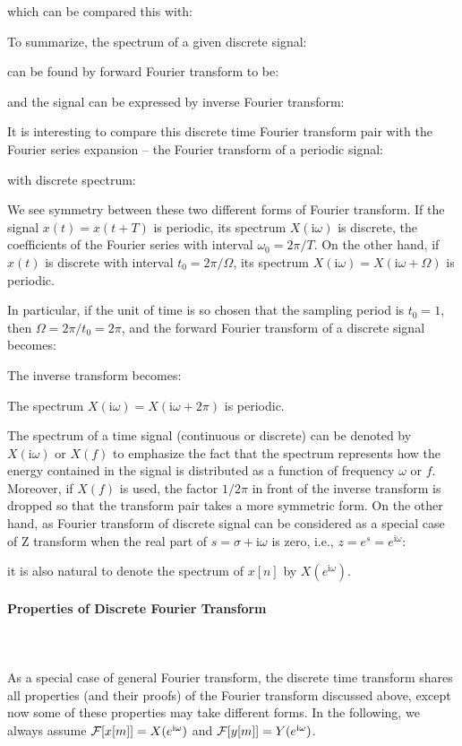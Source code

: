 	which can be compared this with:
	
	To summarize, the spectrum of a given discrete signal:
	
	can be found by forward Fourier transform to be:
	
	and the signal can be expressed by inverse Fourier transform:
	
	It is interesting to compare this discrete time Fourier transform pair with the Fourier series expansion -- the Fourier transform of a periodic signal: 
	
	
	with discrete spectrum:
	
	We see symmetry between these two different forms of Fourier transform. If the  signal $x(t)=x(t+T)$ is periodic, its spectrum $X(\mathrm{i}\omega)$ is discrete, the coefficients of the Fourier series with interval $\omega_0=2\pi/T$. On the other hand, if $x(t)$ is discrete with interval $t_0=2\pi/\Omega$, its spectrum $X(\mathrm{i}\omega)=X(\mathrm{i}\omega+\Omega)$ is periodic.
	
	In particular, if the unit of time is so chosen that the sampling period is $t_0=1$, then $\Omega=2\pi/t_0=2\pi$, and the forward Fourier transform of a discrete signal becomes:
	
	The inverse transform becomes:
	
	The spectrum $X(\mathrm{i}\omega)=X(\mathrm{i}\omega+2\pi)$ is periodic.
	
	
	\begin{tcolorbox}[title=Remark,colframe=black,arc=10pt]
	The spectrum of a time signal (continuous or discrete) can be denoted by $X(\mathrm{i}\omega)$ or $X(f)$ to emphasize the fact that the spectrum represents how the energy contained in the signal is distributed as a function of frequency $\omega$ or $f$. Moreover, if $X(f)$ is used, the factor $1/2\pi$ in front of the inverse transform is dropped so that the transform pair takes a more symmetric form. On the other hand, as Fourier transform of discrete signal can be considered as a special case of Z transform when the real part of $s=\sigma+\mathrm{i}\omega$ is zero, i.e., $z=e^s=e^{\mathrm{i}\omega}$:
	
	it is also natural to denote the spectrum of $x[n]$ by $X(e^{\mathrm{i}\omega})$.
	\end{tcolorbox}
	
	
	\paragraph{Properties of Discrete Fourier Transform}\mbox{}\\\\
	As a special case of general Fourier transform, the discrete time transform  shares all properties (and their proofs) of the Fourier transform discussed above, except now some of these properties may take different forms. In the following, we always assume ${\cal F}[x[m]]=X(e^{\mathrm{i}\omega})$ and 
	${\cal F}[y[m]]=Y(e^{\mathrm{i}\omega})$. 
	
